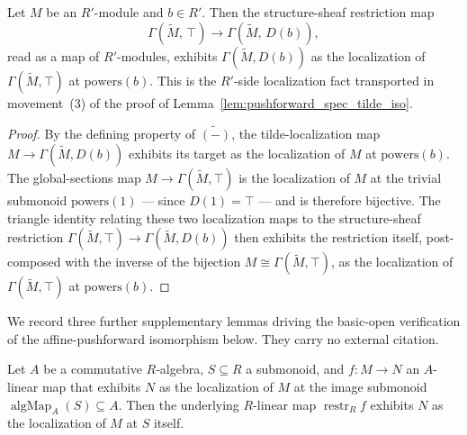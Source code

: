 \begin{lemma}



  \label{lem:tildeRestriction_isLocalizedModule}
  Let \(M\) be an \(R'\)-module and \(b \in R'\). Then the structure-sheaf
  restriction map
  \[
    \Gamma(\widetilde M,\, \top) \longrightarrow \Gamma(\widetilde M,\, D(b)),
  \]
  read as a map of \(R'\)-modules, exhibits \(\Gamma(\widetilde M, D(b))\) as the
  localization of \(\Gamma(\widetilde M, \top)\) at \(\mathrm{powers}(b)\). This is
  the \(R'\)-side localization fact transported in movement~(3) of the proof of
  Lemma~\ref{lem:pushforward_spec_tilde_iso}.
\end{lemma}

\begin{proof}


  By the defining property of \(\widetilde{(-)}\), the tilde-localization map
  \(M \to \Gamma(\widetilde M, D(b))\) exhibits its target as the localization of
  \(M\) at \(\mathrm{powers}(b)\). The global-sections map
  \(M \to \Gamma(\widetilde M, \top)\) is the localization of \(M\) at the trivial
  submonoid \(\mathrm{powers}(1)\) — since \(D(1) = \top\) — and is therefore
  bijective. The triangle identity relating these two localization maps to the
  structure-sheaf restriction \(\Gamma(\widetilde M, \top) \to
  \Gamma(\widetilde M, D(b))\) then exhibits the restriction itself, post-composed
  with the inverse of the bijection \(M \cong \Gamma(\widetilde M, \top)\), as the
  localization of \(\Gamma(\widetilde M, \top)\) at \(\mathrm{powers}(b)\).
\end{proof}

We record three further supplementary lemmas driving the basic-open verification
of the affine-pushforward isomorphism below. They carry no external citation.

\begin{lemma}



  \label{lem:powers_restrictScalars}
  Let \(A\) be a commutative \(R\)-algebra, \(S \subseteq R\) a submonoid, and
  \(f : M \to N\) an \(A\)-linear map that exhibits \(N\) as the localization of
  \(M\) at the image submonoid
  \(\operatorname{algMap}_A(S) \subseteq A\). Then the underlying \(R\)-linear map
  \(\operatorname{restr}_R f\) exhibits \(N\) as the localization of \(M\) at \(S\)
  itself.
\end{lemma}

